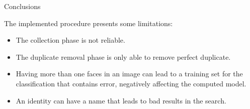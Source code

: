 \begin{tframe}{Conclusions}

The implemented procedure presents some limitations:

\begin{itemize}
\item The collection phase is not reliable.
\item The duplicate removal phase is only able to remove perfect duplicate.
\item Having more than one faces in an image can lead to a training set for the classification that contains error, negatively affecting the computed model.
\item An identity can have a name that leads to bad results in the search.
\end{itemize}

\end{tframe}